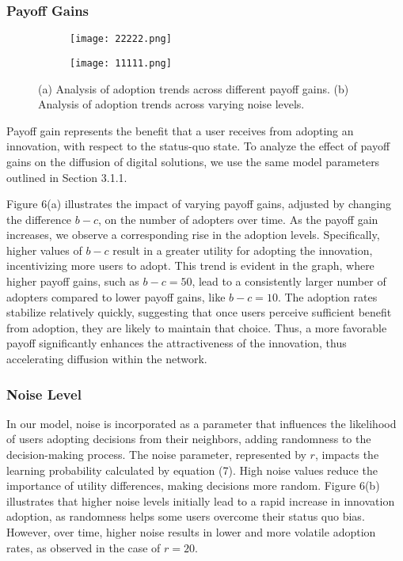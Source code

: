 \documentclass{article} %
\begin{document}
\subsubsection{Payoff Gains}
\begin{figure}[h]
    \centering
    \begin{subfigure}{0.45\textwidth}
        \centering
        \texttt{[image: 22222.png]} %
        \caption{}
        \label{fig:payoff_gains}
    \end{subfigure}
    \hspace{0.05\textwidth}
    \begin{subfigure}{0.45\textwidth}
        \centering
        \texttt{[image: 11111.png]} %
        \caption{}
        \label{fig:noise_sensitivity}
    \end{subfigure}
    \caption{(a) Analysis of adoption trends across different payoff gains. (b) Analysis of adoption trends across varying noise levels.}
    \label{fig:sensitivity_analysis}
\end{figure}
Payoff gain represents the benefit that a user receives from adopting an innovation, with respect to the status-quo state. To analyze the effect of payoff gains on the diffusion of digital solutions, we use the same model parameters outlined in Section 3.1.1. 

Figure 6(a) illustrates the impact of varying payoff gains, adjusted by changing the difference \( b - c \), on the number of adopters over time. As the payoff gain increases, we observe a corresponding rise in the adoption levels. Specifically, higher values of \( b - c \) result in a greater utility for adopting the innovation, incentivizing more users to adopt. This trend is evident in the graph, where higher payoff gains, such as \( b - c = 50 \), lead to a consistently larger number of adopters compared to lower payoff gains, like \( b - c = 10 \). The adoption rates stabilize relatively quickly, suggesting that once users perceive sufficient benefit from adoption, they are likely to maintain that choice. Thus, a more favorable payoff significantly enhances the attractiveness of the innovation, thus accelerating diffusion within the network.


\subsubsection{Noise Level}
In our model, noise is incorporated as a parameter that influences the likelihood of users adopting decisions from their neighbors, adding randomness to the decision-making process. The noise parameter, represented by \( r \), impacts the learning probability calculated by equation (7). High noise values reduce the importance of utility differences, making decisions more random. Figure 6(b) illustrates that higher noise levels initially lead to a rapid increase in innovation adoption, as randomness helps some users overcome their status quo bias. However, over time, higher noise results in lower and more volatile adoption rates, as observed in the case of \(r = 20\).
\end{document}

